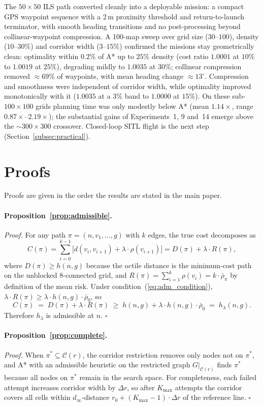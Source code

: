 \documentclass[11pt]{article}
\begin{document}
The $50 \times 50$ ILS path converted cleanly into a deployable mission: a compact GPS waypoint sequence with a 2\,m proximity threshold and return-to-launch terminator, with smooth heading transitions and no post-processing beyond collinear-waypoint compression. A 100-map sweep over grid size ($30$--$100$), density ($10$--$30\%$) and corridor width ($3$--$15\%$) confirmed the missions stay geometrically clean: optimality within $0.2\%$ of A* up to $25\%$ density (cost ratio $1.0001$ at $10\%$ to $1.0019$ at $25\%$), degrading mildly to $1.0035$ at $30\%$; collinear compression removed $\approx 69\%$ of waypoints, with mean heading change $\approx 13^\circ$. Compression and smoothness were independent of corridor width, while optimality improved monotonically with it ($1.0035$ at a $3\%$ band to $1.0000$ at $15\%$). On these sub-$100 \times 100$ grids planning time was only modestly below A* (mean $1.14\times$, range $0.87\times$--$2.19\times$); the substantial gains of Experiments~1, 9 and~14 emerge above the $\sim 300 \times 300$ crossover. Closed-loop SITL flight is the next step (Section~\ref{subsec:practical}).


\section{Proofs}\label{app:proofs-supp}
Proofs are given in the order the results are stated in the main paper.


\paragraph{Proposition~\ref{prop:admissible}.}
\noindent\textit{Proof.}
For any path $\pi = (n, v_1, \ldots, g)$ with $k$ edges, the true cost decomposes as
\[
C(\pi) = \sum_{i=0}^{k-1} \bigl[d(v_i, v_{i+1}) + \lambda \cdot \rho(v_{i+1})\bigr] = D(\pi) + \lambda \cdot R(\pi),
\]
where $D(\pi) \geq h(n,g)$ because the octile distance is the minimum-cost path on the unblocked 8-connected grid, and $R(\pi) = \sum_{i=1}^{k} \rho(v_i) = k \cdot \bar{\rho}_\pi$ by definition of the mean risk.
Under condition~(\ref{eq:adm_condition}), $\lambda \cdot R(\pi) \geq \lambda \cdot h(n,g) \cdot \bar{\rho}_0$, so
\[
C(\pi) \;=\; D(\pi) + \lambda \cdot R(\pi) \;\geq\; h(n,g) + \lambda \cdot h(n,g) \cdot \bar{\rho}_0 \;=\; h_\lambda(n,g).
\]
Therefore $h_\lambda$ is admissible at $n$. $\square$

\paragraph{Proposition~\ref{prop:complete}.}
\noindent\textit{Proof.}
When $\pi^* \subseteq \mathcal{C}(r)$, the corridor restriction removes only nodes not on $\pi^*$, and A* with an admissible heuristic on the restricted graph $G|_{\mathcal{C}(r)}$ finds $\pi^*$ because all nodes on $\pi^*$ remain in the search space.
For completeness, each failed attempt increases corridor width by $\Delta r$, so after $K_{\max}$ attempts the corridor covers all cells within $d_\infty$-distance $r_0 + (K_{\max}-1) \cdot \Delta r$ of the reference line.
$\square$
\end{document}
